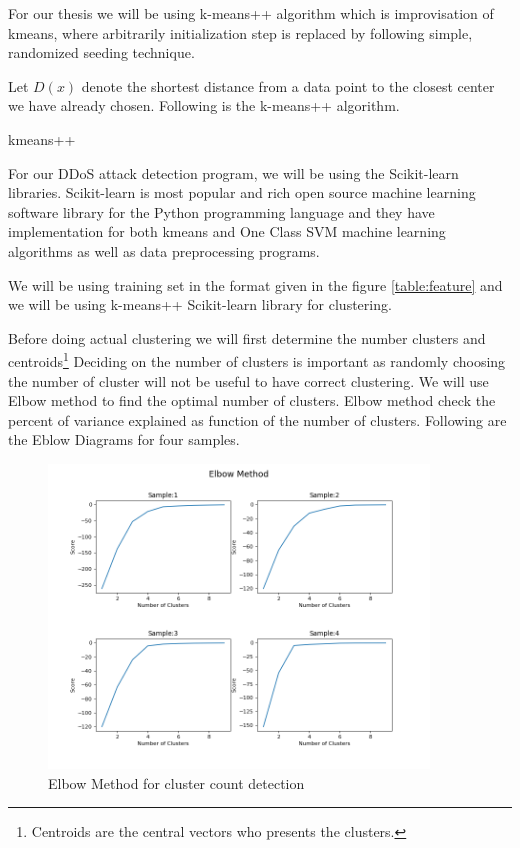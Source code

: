 \documentclass[10pt,oneside,a4paper]{article}
\begin{document}
For our thesis we will be using k-means++ algorithm which is improvisation of kmeans, where arbitrarily initialization step is replaced by following simple, randomized seeding technique.

Let $D(x)$ denote the shortest distance from a data point to the closest center we have already chosen. Following is the k-means++ algorithm.

\begin{algorithm}
\caption{kmeans++}\label{kmeans++}
\begin{algorithmic}[1]
\end{algorithmic}
\end{algorithm}

For our DDoS attack detection program, we will be using the Scikit-learn libraries. Scikit-learn is most popular and rich open source machine learning software library for the Python programming language and they have implementation for both kmeans and One Class SVM machine learning algorithms as well as data preprocessing programs.

We will be using training set in the format given in the figure \ref{table:feature} and we will be using k-means++ Scikit-learn library for clustering.

Before doing actual clustering we will first determine the number clusters and centroids\footnote{Centroids are the central vectors who presents the clusters.} Deciding on the number of clusters is important as randomly choosing the number of cluster will not be useful to have correct clustering. We will use Elbow method to find the optimal number of clusters. Elbow method check the percent of variance explained as function of the number of clusters. Following are the Eblow Diagrams for four samples.

\begin{figure}[H]
\centering
\includegraphics[width=0.90\textwidth]{elbow-method}
\caption{Elbow Method for cluster count detection} \label{fig:elbowmethod}
\end{figure}
\end{document}
